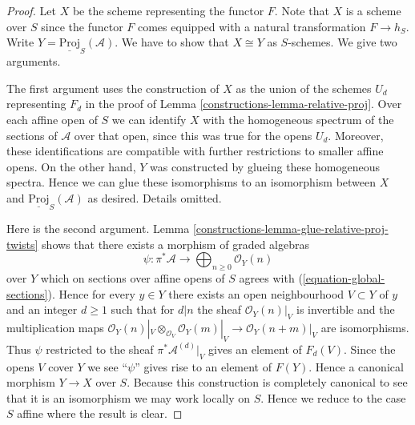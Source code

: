\begin{proof}

Let $X$ be the scheme representing the functor $F$.
Note that $X$ is a scheme over $S$ since the functor $F$
comes equipped with a natural transformation $F \to h_S$.
Write $Y = \underline{\text{Proj}}_S(\mathcal{A})$.
We have to show that $X \cong Y$ as $S$-schemes.
We give two arguments.

\medskip\noindent
The first argument uses the construction of $X$ as the union
of the schemes $U_d$ representing $F_d$ in the
proof of Lemma \ref{constructions-lemma-relative-proj}.
Over each affine open of $S$ we can identify $X$ with the homogeneous spectrum
of the sections of $\mathcal{A}$ over that open, since this was
true for the opens $U_d$. Moreover, these identifications
are compatible with further restrictions to smaller affine opens.
On the other hand, $Y$ was constructed by glueing these
homogeneous spectra.
Hence we can glue these isomorphisms to an isomorphism
between $X$ and $\underline{\text{Proj}}_S(\mathcal{A})$ as
desired. Details omitted.

\medskip\noindent
Here is the second argument.
Lemma \ref{constructions-lemma-glue-relative-proj-twists}
shows that there exists a morphism of graded algebras
$$
\psi : \pi^*\mathcal{A}
\longrightarrow
\bigoplus\nolimits_{n \geq 0} \mathcal{O}_Y(n)
$$
over $Y$ which on sections over affine opens of $S$ agrees with
(\ref{equation-global-sections}). Hence for every $y \in Y$
there exists an open neighbourhood $V \subset Y$ of $y$
and an integer $d \geq 1$ such that for $d | n$ the sheaf
$\mathcal{O}_Y(n)|_V$ is invertible and the multiplication maps
$\mathcal{O}_Y(n)|_V \otimes_{\mathcal{O}_V} \mathcal{O}_Y(m)|_V
\to \mathcal{O}_Y(n + m)|_V$ are isomorphisms. Thus
$\psi$ restricted to the sheaf $\pi^*\mathcal{A}^{(d)}|_V$
gives an element of $F_d(V)$. Since the opens $V$ cover $Y$
we see ``$\psi$'' gives rise to an element of $F(Y)$.
Hence a canonical morphism $Y \to X$ over $S$.
Because this construction is completely canonical to see
that it is an isomorphism we may work locally on $S$.
Hence we reduce to the case $S$ affine where the result is clear.
\end{proof}

